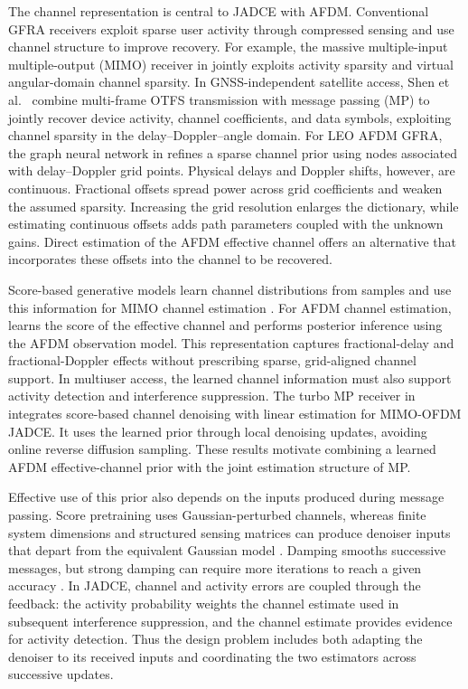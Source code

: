 The channel representation is central to JADCE with AFDM. Conventional
GFRA receivers exploit sparse user activity through compressed sensing
and use channel structure to improve recovery. For example, the
massive multiple-input multiple-output (MIMO) receiver in
\cite{ke2020} jointly exploits activity sparsity and virtual
angular-domain channel sparsity. In GNSS-independent satellite access,
Shen et al.\ \cite{shen2025} combine multi-frame OTFS transmission with
message passing (MP) to jointly recover device activity, channel coefficients, and data
symbols, exploiting channel sparsity in the delay--Doppler--angle domain.
For LEO AFDM GFRA, the graph neural
network in \cite{ding2026} refines a sparse channel prior using nodes
associated with delay--Doppler grid points. Physical delays and Doppler
shifts, however, are continuous. Fractional offsets spread power across
grid coefficients and weaken the assumed sparsity. Increasing the grid
resolution enlarges the dictionary, while estimating continuous offsets
adds path parameters coupled with the unknown gains. Direct estimation
of the AFDM effective channel offers an alternative that incorporates
these offsets into the channel to be recovered.

Score-based generative models learn channel distributions from samples
and use this information for MIMO channel estimation \cite{arvinte2023}.
For AFDM channel estimation, \cite{huang2026} learns the score of the
effective channel and performs posterior inference using the AFDM
observation model. This representation captures fractional-delay and
fractional-Doppler effects without prescribing sparse, grid-aligned
channel support. In multiuser access, the learned channel information
must also support activity detection and interference suppression.
The turbo MP receiver in \cite{cai2026} integrates
score-based channel denoising with linear estimation for MIMO-OFDM
JADCE. It uses the learned prior through local denoising updates,
avoiding online reverse diffusion sampling. These results motivate
combining a learned AFDM effective-channel prior with the joint
estimation structure of MP.

Effective use of this prior also depends on the inputs produced during
message passing. Score pretraining uses Gaussian-perturbed channels,
whereas finite system dimensions and structured sensing matrices can
produce denoiser inputs that depart from the equivalent Gaussian model
\cite{cai2026}. Damping smooths successive messages, but strong damping
can require more iterations to reach a given accuracy
\cite{yoshida2023}. In JADCE, channel and activity errors are coupled
through the feedback: the activity probability weights the channel
estimate used in subsequent interference suppression, and the channel
estimate provides evidence for activity detection. Thus the design
problem includes both adapting the denoiser to its received inputs and
coordinating the two estimators across successive updates.

